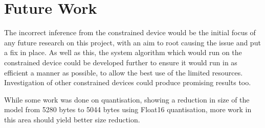 \documentclass{svproc}
\begin{document}
\section{Future Work}
The incorrect inference from the constrained device would be the initial focus of any future research on this project, with an aim to root 
causing the issue and put a fix in place. As well as this, the system algorithm which would run on the constrained device could be developed 
further to ensure it would run in as efficient a manner as possible, to allow the best use of the limited resources. Investigation of other 
constrained devices could produce promising results too. 

While some work was done on quantisation, showing a reduction in size of the model from 5280 bytes to 5044 bytes using Float16 quantisation, 
more work in this area should yield better size reduction.
\end{document}

